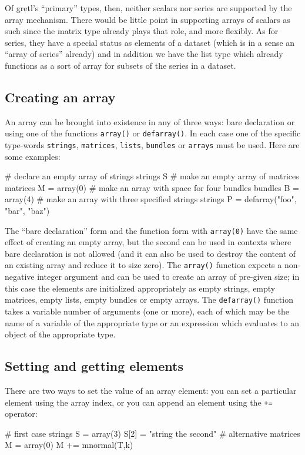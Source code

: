 Of gretl's ``primary'' types, then, neither scalars nor series are
supported by the array mechanism. There would be little point in
supporting arrays of scalars as such since the matrix type already
plays that role, and more flexibly. As for series, they have a special
status as elements of a dataset (which is in a sense an ``array of
series'' already) and in addition we have the list type which already
functions as a sort of array for subsets of the series in a dataset.

\subsection{Creating an array}

An array can be brought into existence in any of three ways: bare
declaration or using one of the functions \texttt{array()} or
\texttt{defarray()}. In each case one of the specific type-words
\texttt{strings}, \texttt{matrices}, \texttt{lists}, \texttt{bundles}
or \texttt{arrays} must be used. Here are some examples:

\begin{code}
# declare an empty array of strings
strings S
# make an empty array of matrices
matrices M = array(0)
# make an array with space for four bundles
bundles B = array(4)
# make an array with three specified strings
strings P = defarray("foo", "bar", "baz")
\end{code}

The ``bare declaration'' form and the function form with
\texttt{array(0)} have
the same effect of creating an empty array, but the second can be used
in contexts where bare declaration is not allowed (and it can also be
used to destroy the content of an existing array and reduce it to size
zero). The \texttt{array()} function expects a non-negative integer
argument and can be used to create an array of pre-given size; in this
case the elements are initialized appropriately as empty strings, empty
matrices, empty lists, empty bundles or empty arrays. The
\texttt{defarray()} function takes a variable number of arguments (one
or more), each of which may be the name of a variable of the
appropriate type or an expression which evaluates to an object of the
appropriate type.

\subsection{Setting and getting elements}

There are two ways to set the value of an array element: you can set a
particular element using the array index, or you can append an element
using the \texttt{+=} operator:
\begin{code}
# first case
strings S = array(3)
S[2] = "string the second"
# alternative
matrices M = array(0)
M += mnormal(T,k)
\end{code}

